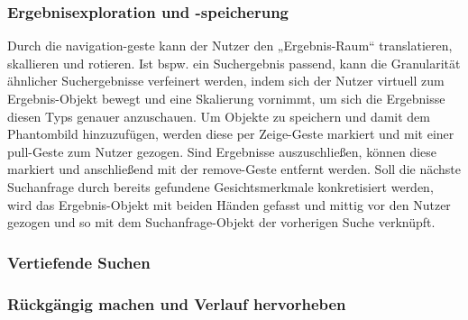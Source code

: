 \documentclass{sigchi-ext}
\begin{document}
\subsubsection{Ergebnisexploration und -speicherung}
Durch die navigation-geste kann der Nutzer den „Ergebnis-Raum“ translatieren, skallieren und rotieren. Ist bspw. ein Suchergebnis passend, kann die Granularität ähnlicher Suchergebnisse verfeinert werden, indem sich der Nutzer virtuell zum Ergebnis-Objekt bewegt und eine Skalierung vornimmt, um sich die Ergebnisse diesen Typs genauer anzuschauen.
Um Objekte zu speichern und damit dem Phantombild hinzuzufügen, werden diese per Zeige-Geste markiert und mit einer pull-Geste zum Nutzer gezogen. Sind Ergebnisse auszuschließen, können diese markiert und anschließend mit der remove-Geste entfernt werden.
Soll die nächste Suchanfrage durch bereits gefundene Gesichtsmerkmale konkretisiert werden, wird das Ergebnis-Objekt mit beiden Händen gefasst und mittig vor den Nutzer gezogen und so mit dem Suchanfrage-Objekt der vorherigen Suche verknüpft.

\subsubsection{Vertiefende Suchen}

\subsubsection{Rückgängig machen und Verlauf hervorheben}

\balance{} 



\end{document}
